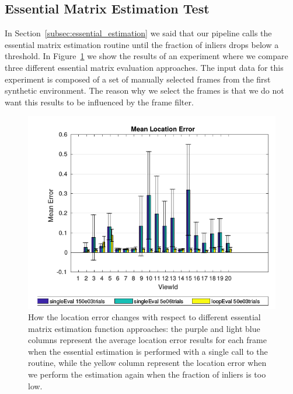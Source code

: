 \subsection{Essential Matrix Estimation Test}\label{subsec:essential_test}
In Section~\ref{subsec:essential_estimation} we said that our pipeline
calls the essential matrix estimation routine until the fraction of inliers
drops below a threshold. In Figure~\ref{fig:essential_test} we show the
results of an experiment where we compare three different essential matrix
evaluation approaches. The input data for this experiment is composed of
a set of manually selected frames from the first synthetic environment.
The reason why we select the frames is that we do not want this results to be
influenced by the frame filter.
%
\begin{figure}[h]
\centering
\includegraphics[width=\linewidth]{img/essentialEstimation.png}
\caption{How the location error changes with respect to different essential
matrix estimation function approaches: the purple and light blue columns
represent the average location error results for each frame when the
essential estimation is performed with a single call to the routine, while the
yellow column represent the location error when we perform the estimation
again when the fraction of inliers is too low.}
\label{fig:essential_test}
\end{figure}


